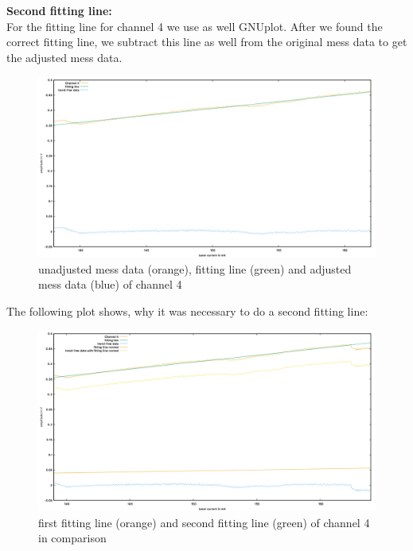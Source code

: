 \textbf{Second fitting line:}\\
For the fitting line for channel 4 we use as well GNUplot.
After we found the correct fitting line, we subtract this line as well from the original 
mess data to get the adjusted mess data.
\begin{center}
    \begin{figure}[h]
        \centering
        \includegraphics[scale=0.3]{Bilder/Auswertung_Anna/clean_ch4.png}
        \caption{unadjusted mess data (orange), fitting line (green) and adjusted mess data (blue) of channel 4 }
        \label{fig:ch4_clear}
    \end{figure}
\end{center}
The following plot shows, why it was necessary to do a second fitting line:\\
\begin{center}
    \begin{figure}[h]
        \centering
        \includegraphics[scale=0.3]{Bilder/Auswertung_Anna/all_ch4.png}
        \caption{first fitting line (orange) and second fitting line (green) of channel 4 in comparison}
        \label{fig:ch4_all}
    \end{figure}
\end{center}
